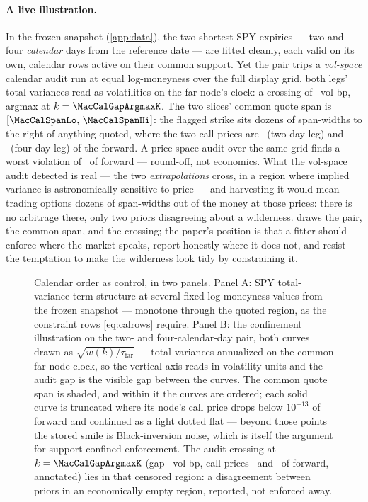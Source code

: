 \paragraph{A live illustration.}
In the frozen snapshot (\cref{app:data}), the two shortest SPY expiries
--- two and four \emph{calendar} days from the reference date --- are
fitted cleanly, each valid on its own, calendar rows active on their
common support.  Yet the pair trips a \emph{vol-space} calendar audit
run at equal log-moneyness over the full display grid, both legs' total
variances read as volatilities on the far node's clock: a crossing of
\MacCalGapVolBp\ vol bp, argmax at $k=\MacCalGapArgmaxK$.  The two
slices' common quote span is $[\MacCalSpanLo,\,\MacCalSpanHi]$: the
flagged strike sits dozens of span-widths to the right of anything
quoted, where the two call prices are \MacCalendarCallShort\ (two-day
leg) and \MacCalendarCallLong\ (four-day leg) of the forward.  A
price-space audit over the same grid finds a worst violation of
\MacCalPriceGridWorst\ of forward --- round-off, not economics.  What
the vol-space audit detected is real --- the two \emph{extrapolations}
cross, in a region where implied variance is astronomically sensitive
to price --- and harvesting it would mean trading options dozens of
span-widths out of the money at those prices: there is no arbitrage
there, only two priors disagreeing about a wilderness.
 draws the pair, the common span, and the crossing;
the paper's position is that a fitter should enforce where the market
speaks, report honestly where it does not, and resist the temptation to
make the wilderness look tidy by constraining it.

\begin{figure}[htbp]
\centering
{}
\caption{Calendar order as control, in two panels.  Panel A: SPY
total-variance term structure at several fixed log-moneyness values
from the frozen snapshot --- monotone through the quoted region, as the
constraint rows \eqref{eq:calrows} require.  Panel B: the confinement
illustration on the two- and four-calendar-day pair, both curves drawn
as $\sqrt{w(k)/\tau_{\mathrm{far}}}$ --- total variances annualized on
the common far-node clock, so the vertical axis reads in volatility
units and the audit gap is the visible gap between the curves.  The
common quote span is shaded, and within it the curves are ordered; each
solid curve is truncated where its node's call price drops below
$10^{-13}$ of forward and continued as a light dotted flat --- beyond
those points the stored smile is Black-inversion noise, which is itself
the argument for support-confined enforcement.  The audit crossing at
$k=\MacCalGapArgmaxK$ (gap \MacCalGapVolBp\ vol bp, call prices
\MacCalendarCallShort\ and \MacCalendarCallLong\ of forward, annotated)
lies in that censored region: a disagreement between priors in an
economically empty region, reported, not enforced away.}
\label{fig:calendar}
\end{figure}
